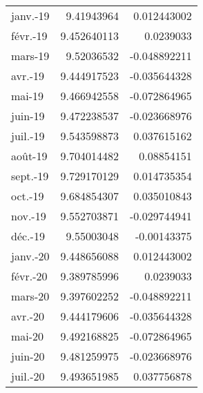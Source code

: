 \begin{tabular}{@{}lrr@{}}
    janv.-19                 & 9.41943964                        & 0.012443002                       \\
    févr.-19                 & 9.452640113                       & 0.0239033                         \\
    mars-19                  & 9.52036532                        & -0.048892211                      \\
    avr.-19                  & 9.444917523                       & -0.035644328                      \\
    mai-19                   & 9.466942558                       & -0.072864965                      \\
    juin-19                  & 9.472238537                       & -0.023668976                      \\
    juil.-19                 & 9.543598873                       & 0.037615162                       \\
    août-19                  & 9.704014482                       & 0.08854151                        \\
    sept.-19                 & 9.729170129                       & 0.014735354                       \\
    oct.-19                  & 9.684854307                       & 0.035010843                       \\
    nov.-19                  & 9.552703871                       & -0.029744941                      \\
    déc.-19                  & 9.55003048                        & -0.00143375                       \\
    janv.-20                 & 9.448656088                       & 0.012443002                       \\
    févr.-20                 & 9.389785996                       & 0.0239033                         \\
    mars-20                  & 9.397602252                       & -0.048892211                      \\
    avr.-20                  & 9.444179606                       & -0.035644328                      \\
    mai-20                   & 9.492168825                       & -0.072864965                      \\
    juin-20                  & 9.481259975                       & -0.023668976                      \\
    juil.-20                 & 9.493651985                       & 0.037756878                       \\

\end{tabular}
